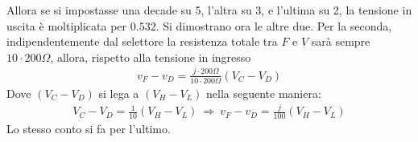 \documentclass[a4paper, oneside]{article}
\begin{document}
Allora se si impostasse una decade su 5, l'altra su 3, e l'ultima su 2, la tensione in uscita è
moltiplicata per $0.532$. Si dimostrano ora le altre due. Per la seconda, indipendentemente 
dal selettore la resistenza totale tra $F$ e $V$ sarà sempre $10 \cdot 200\Omega$, allora,
rispetto alla tensione in ingresso
\begin{gather*}
    v_F - v_D = \frac{j \cdot 200\Omega}{10 \cdot 200 \Omega} (V_C - V_D)
\end{gather*}
Dove $(V_C - V_D)$ si lega a $(V_H - V_L)$ nella seguente maniera:
\begin{gather*}
    V_C - V_D = \frac{1}{10}(V_H - V_L) \ \Longrightarrow \ v_F - v_D = \frac{j}{100}(V_H - V_L) 
\end{gather*}
Lo stesso conto si fa per l'ultimo.
\end{document}
